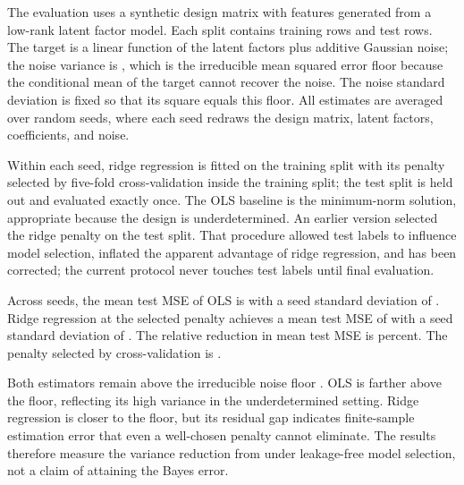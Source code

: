 The evaluation uses a synthetic design matrix with  features generated from a low-rank latent factor model. Each split contains  training rows and  test rows. The target is a linear function of the latent factors plus additive Gaussian noise; the noise variance is , which is the irreducible mean squared error floor because the conditional mean of the target cannot recover the noise. The noise standard deviation is fixed so that its square equals this floor. All estimates are averaged over  random seeds, where each seed redraws the design matrix, latent factors, coefficients, and noise.

Within each seed, ridge regression \citep{hoerl1970ridge} is fitted on the training split with its penalty selected by five-fold cross-validation inside the training split; the test split is held out and evaluated exactly once. The OLS baseline is the minimum-norm solution, appropriate because the design is underdetermined. An earlier version selected the ridge penalty on the test split. That procedure allowed test labels to influence model selection, inflated the apparent advantage of ridge regression, and has been corrected; the current protocol never touches test labels until final evaluation.

Across seeds, the mean test MSE of OLS is  with a seed standard deviation of . Ridge regression at the selected penalty achieves a mean test MSE of  with a seed standard deviation of . The relative reduction in mean test MSE is  percent. The penalty selected by cross-validation is .

Both estimators remain above the irreducible noise floor . OLS is farther above the floor, reflecting its high variance in the underdetermined setting. Ridge regression is closer to the floor, but its residual gap indicates finite-sample estimation error that even a well-chosen penalty cannot eliminate. The results therefore measure the variance reduction from \citep{hoerl1970ridge} under leakage-free model selection, not a claim of attaining the Bayes error.
